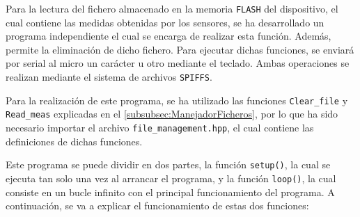 Para la lectura del fichero almacenado en la memoria \texttt{FLASH} del dispositivo, el cual contiene las medidas obtenidas por los sensores, se ha desarrollado un programa independiente el cual se encarga de realizar esta función. Además, permite la eliminación de dicho fichero. Para ejecutar dichas funciones, se enviará por serial al micro un carácter u otro mediante el teclado. Ambas operaciones se realizan mediante el sistema de archivos \texttt{SPIFFS}.


Para la realización de este programa, se ha utilizado las funciones \texttt{Clear\_file} y \texttt{Read\_meas} explicadas en el \autoref{subsubsec:ManejadorFicheros}, por lo que ha sido necesario importar el archivo \texttt{file\_management.hpp}, el cual contiene las definiciones de dichas funciones.

Este programa se puede dividir en dos partes, la función \texttt{setup()}, la cual se ejecuta tan solo una vez al arrancar el programa, y la función \texttt{loop()}, la cual consiste en un bucle infinito con el principal funcionamiento del programa. A continuación, se va a explicar el funcionamiento de estas dos funciones:

